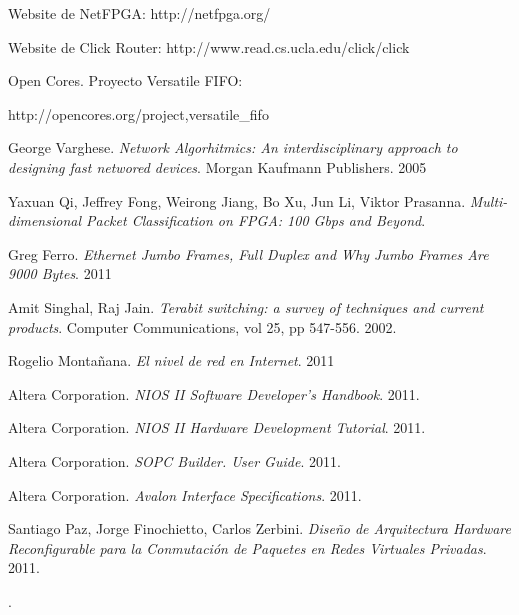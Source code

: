 \begin{thebibliography}{10}

 Website de NetFPGA: http://netfpga.org/

 Website de Click Router: http://www.read.cs.ucla.edu/click/click

 Open Cores. Proyecto Versatile FIFO:

http://opencores.org/project,versatile\_fifo

 George Varghese. \textit{Network Algorhitmics: An interdisciplinary approach to designing fast networed devices}. Morgan Kaufmann Publishers. 2005 

Yaxuan Qi, Jeffrey Fong, Weirong Jiang, Bo Xu, Jun Li, Viktor Prasanna. \textit{Multi-dimensional Packet Classification on FPGA: 100 Gbps and Beyond}.

 Greg Ferro. \textit{Ethernet Jumbo Frames, Full Duplex and Why Jumbo Frames Are 9000 Bytes}. 2011

Amit Singhal, Raj Jain. \textit{Terabit switching: a survey of techniques and current products}. Computer Communications, vol 25, pp 547-556. 2002.


 Rogelio Montañana. \textit{El nivel de red en Internet}. 2011

 Altera Corporation. \textit{NIOS II Software Developer's Handbook}. 2011.

 Altera Corporation. \textit{NIOS II Hardware Development Tutorial}. 2011.

 Altera Corporation. \textit{SOPC Builder. User Guide}. 2011.

 Altera Corporation. \textit{Avalon Interface Specifications}. 2011.

 Santiago Paz, Jorge Finochietto, Carlos Zerbini. \textit{Diseño de Arquitectura Hardware Reconfigurable para la Conmutación de Paquetes en Redes Virtuales Privadas}. 2011.



\end{thebibliography}.

